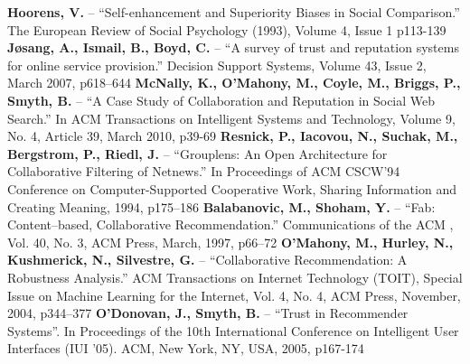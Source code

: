 \documentclass[]{final_report}
\begin{document}
\linebreak
\linebreak
\textbf{Hoorens, V.} -- ``Self-enhancement and Superiority Biases in Social Comparison.'' The European Review of Social Psychology (1993), Volume 4, Issue 1 p113-139
\linebreak
\linebreak
\textbf{Jøsang, A., Ismail, B., Boyd, C.} -- ``A survey of trust and reputation systems for online service provision.'' Decision Support Systems, Volume 43, Issue 2, March 2007, p618–644
\linebreak
\linebreak
\textbf{McNally, K., O'Mahony, M., Coyle, M., Briggs, P., Smyth, B.} -- ``A Case Study of Collaboration and Reputation in Social Web Search.'' In ACM Transactions on Intelligent Systems and Technology, Volume 9, No. 4, Article 39, March 2010, p39-69
\linebreak
\linebreak
\textbf{Resnick, P., Iacovou, N., Suchak, M., Bergstrom, P., Riedl, J.} -- ``Grouplens: An Open Architecture for Collaborative Filtering of Netnews.'' In Proceedings of ACM CSCW’94 Conference on Computer-Supported Cooperative Work, Sharing Information and Creating Meaning, 1994, p175–186
\linebreak
\linebreak
\textbf{Balabanovic, M., Shoham, Y.} -- ``Fab: Content–based, Collaborative Recommendation.'' Communications of the ACM , Vol. 40, No. 3, ACM Press, March, 1997, p66–72
\linebreak
\linebreak
\textbf{O’Mahony, M., Hurley, N., Kushmerick, N., Silvestre, G.} -- ``Collaborative Recommendation: A Robustness Analysis.'' ACM Transactions on Internet Technology (TOIT), Special Issue on Machine Learning for the Internet, Vol. 4, No. 4, ACM Press, November, 2004, p344–377
\linebreak
\linebreak
\textbf{O'Donovan, J., Smyth, B.} -- ``Trust in Recommender Systems''. In Proceedings of the 10th International Conference on Intelligent User Interfaces (IUI '05). ACM, New York, NY, USA, 2005, p167-174




\label{endpage}
\end{document}
